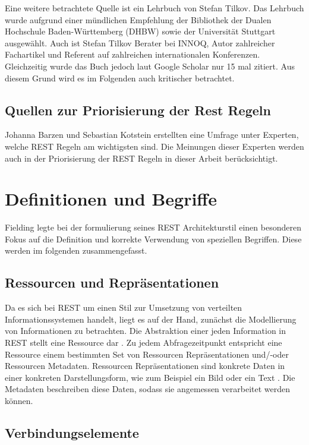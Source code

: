 Eine weitere betrachtete Quelle ist ein Lehrbuch von Stefan Tilkov. Das Lehrbuch wurde aufgrund einer mündlichen Empfehlung der Bibliothek der Dualen Hochschule Baden-Württemberg (DHBW) sowie der Universität Stuttgart ausgewählt. Auch ist Stefan Tilkov Berater bei INNOQ, Autor zahlreicher Fachartikel und Referent auf zahlreichen internationalen Konferenzen. Gleichzeitig wurde das Buch jedoch laut Google Scholar nur 15 mal zitiert. Aus diesem Grund wird es im Folgenden auch kritischer betrachtet.

\subsection{Quellen zur Priorisierung der Rest Regeln}

Johanna Barzen und Sebastian Kotstein erstellten eine Umfrage unter Experten, welche REST Regeln am wichtigsten sind. Die Meinungen dieser Experten werden auch in der Priorisierung der REST Regeln in dieser Arbeit berücksichtigt.

\section{Definitionen und Begriffe}

Fielding legte bei der formulierung seines REST Architekturstil einen besonderen Fokus auf die Definition und korrekte Verwendung von speziellen Begriffen. Diese werden im folgenden zusammengefasst.

\subsection{Ressourcen und Repräsentationen}

Da es sich bei REST um einen Stil zur Umsetzung von verteilten Informationssystemen handelt, liegt es auf der Hand, zunächst die Modellierung von Informationen zu betrachten. Die Abstraktion einer jeden Information in REST stellt eine Ressource dar . Zu jedem Abfragezeitpunkt entspricht eine Ressource einem bestimmten Set von Ressourcen Repräsentationen und/-oder Ressourcen Metadaten. Ressourcen Repräsentationen sind konkrete Daten in einer konkreten Darstellungsform, wie zum Beispiel ein Bild oder ein Text  . Die Metadaten beschreiben diese Daten, sodass sie angemessen verarbeitet werden können.

\subsection{Verbindungselemente}

